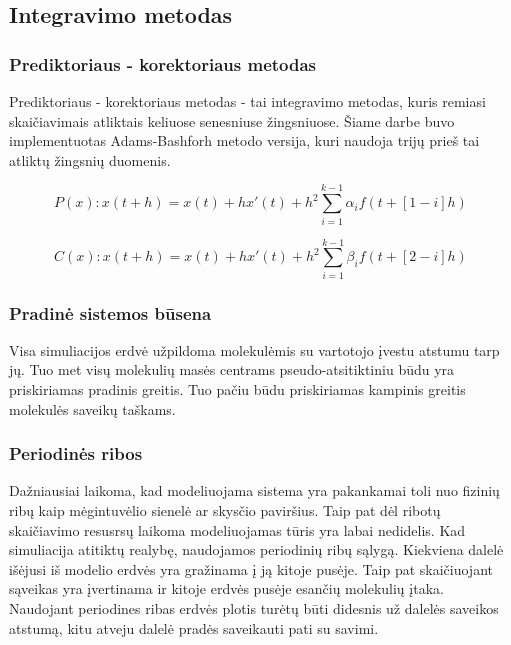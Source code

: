 \subsection{Integravimo metodas}


\subsubsection{Prediktoriaus - korektoriaus metodas}
\label{sec:predictor}

Prediktoriaus - korektoriaus metodas - tai integravimo metodas, kuris remiasi skaičiavimais atliktais keliuose senesniuse žingsniuose.
Šiame darbe buvo implementuotas Adams-Bashforh metodo versija, kuri naudoja trijų prieš tai atliktų žingsnių duomenis.

\begin{equation} \label{eq:pred}
    P(x): x(t+h) = x(t) + hx'(t) +  h^2 \sum\limits_{i=1}^{k-1} {{\alpha}_i f(t+[1-i]h)}
\end{equation}

\begin{equation} \label{eq:corr}
    C(x): x(t+h) = x(t) + hx'(t) +  h^2 \sum\limits_{i=1}^{k-1} {{\beta}_i f(t+[2-i]h)}
\end{equation}


\subsubsection{Pradinė sistemos būsena}
\label{sec:initial_state}

Visa simuliacijos erdvė užpildoma molekulėmis su vartotojo įvestu atstumu tarp jų.
Tuo met visų molekulių masės centrams pseudo-atsitiktiniu būdu yra priskiriamas pradinis greitis.
Tuo pačiu būdu priskiriamas kampinis greitis molekulės saveikų taškams.


\subsubsection{Periodinės ribos}
\label{sec:periodic_boundaries}

Dažniausiai laikoma, kad modeliuojama sistema yra pakankamai toli nuo fizinių ribų kaip mėgintuvėlio sienelė ar skysčio paviršius.
Taip pat dėl ribotų skaičiavimo resusrsų laikoma modeliuojamas tūris yra labai nedidelis.
Kad simuliacija atitiktų realybę, naudojamos periodinių ribų sąlygą.
Kiekviena dalelė išėjusi iš modelio erdvės yra gražinama į ją kitoje pusėje.
Taip pat skaičiuojant sąveikas yra įvertinama ir kitoje erdvės pusėje esančių molekulių įtaka.
Naudojant periodines ribas erdvės plotis turėtų būti didesnis už dalelės saveikos atstumą,
kitu atveju dalelė pradės saveikauti pati su savimi.


